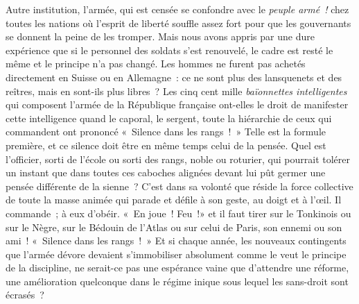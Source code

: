 \documentclass[french,twoside]{book} %
\begin{document}
Autre institution, l’armée, qui est censée se confondre avec le \emph{peuple armé !} chez toutes les nations où l’esprit de liberté souffle assez fort pour que les gouvernants se donnent la peine de les tromper. Mais nous avons appris par une dure expérience que si le personnel des soldats s’est renouvelé, le cadre est resté le même et le principe  n’a pas changé. Les hommes ne furent pas achetés directement en Suisse ou en Allemagne : ce ne sont plus des lansquenets et des reîtres, mais en sont-ils plus libres ? Les cinq cent mille \emph{baïonnettes intelligentes} qui composent l’armée de la République française ont-elles le droit de manifester cette intelligence quand le caporal, le sergent, toute la hiérarchie de ceux qui commandent ont prononcé « Silence dans les rangs ! » Telle est la formule première, et ce silence doit être en même temps celui de la pensée. Quel est l’officier, sorti de l’école ou sorti des rangs, noble ou roturier, qui pourrait tolérer un instant que dans toutes ces caboches alignées devant lui pût germer une pensée différente de la sienne ? C’est dans  sa volonté que réside la force collective de toute la masse animée qui parade et défile à son geste, au doigt et à l’œil. Il commande ; à eux d’obéir. « En joue ! Feu !» et il faut tirer sur le Tonkinois ou sur le Nègre, sur le Bédouin de l’Atlas ou sur celui de Paris, son ennemi ou son ami ! « Silence dans les rangs ! » Et si chaque année, les nouveaux contingents que l’armée dévore devaient s’immobiliser absolument comme le veut le principe de la discipline, ne serait-ce pas une espérance vaine que d’attendre une réforme, une amélioration quelconque dans le régime inique sous lequel les sans-droit sont écrasés ?\par
\end{document}
